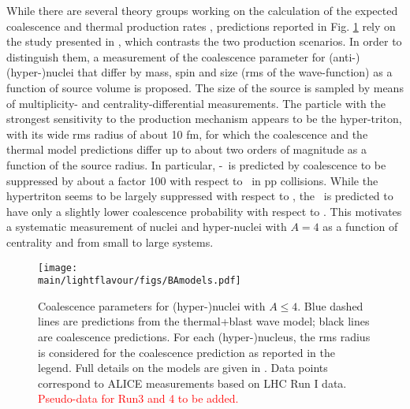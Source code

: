 While there are several theory groups working on the calculation of the expected coalescence \cite{Scheibl:1998tk, Cho:2017dcy, Zhang:2018euf, Bazak:2018hgl, Zhao:2018lyf} and thermal production rates \cite{Andronic:2010qu, Wheaton:2004qb, Petran:2013dva}, predictions reported in Fig. \ref{fig:BAmodels} rely on the study presented in \cite{Bellini:2018epz}, which contrasts the two production scenarios. 
In order to distinguish them, a measurement of the coalescence parameter for (anti-)(hyper-)nuclei that differ by mass, spin and size (rms of the wave-function)  as a function of source volume is proposed. The size of the source is sampled by means of multiplicity- and centrality-differential measurements.
The particle with the strongest sensitivity to the production mechanism appears to be the hyper-triton, with its wide rms radius of about 10 fm, for which the coalescence and the thermal model predictions differ up to about two orders of magnitude as a function of the source radius. 
In particular, \hyp~is predicted by coalescence to be suppressed by about a factor 100 with respect to \hethree~in pp collisions. 
While the hypertriton seems to be largely suppressed with respect to \hethree, the \hypfour~is predicted to have only a slightly lower coalescence probability with respect to \hefour. This motivates a systematic measurement of nuclei and hyper-nuclei with $A=4$ as a function of centrality and from small to large systems.
 
 \begin{figure}[h]
\begin{center}
\texttt{[image: \\main/lightflavour/figs/BAmodels.pdf]}
\end{center}
\caption{Coalescence parameters for (hyper-)nuclei with $A \leq 4$. Blue dashed lines are predictions from the thermal+blast wave model; black lines are coalescence predictions. For each (hyper-)nucleus, the rms radius is considered for the coalescence prediction as reported in the legend. Full details on the models are given in \cite{Bellini:2018epz}. Data points correspond to ALICE measurements based on LHC Run I data. \textcolor{red}{Pseudo-data for Run3 and 4 to be added.}}
\label{fig:BAmodels}
\end{figure} 

